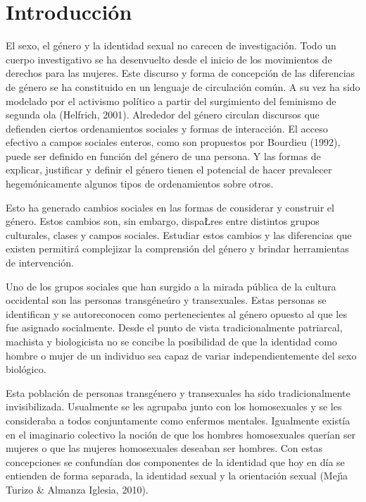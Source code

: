 \chapter{Introducción}\label{intro}

El sexo, el género y la identidad sexual no carecen de investigación.
Todo un cuerpo investigativo se ha desenvuelto desde el inicio de los
movimientos de derechos para las mujeres.
Este discurso y forma de concepción de las diferencias de género se ha
constituido en un lenguaje de circulación común.
A su vez ha sido modelado por el activismo político a partir del surgimiento
del feminismo de segunda ola (Helfrich, 2001).
Alrededor del género circulan discursos que defienden ciertos ordenamientos
sociales y formas de interacción.
El acceso efectivo a campos sociales enteros, como son propuestos por
Bourdieu (1992), puede ser definido en función del género de una persona.
Y las formas de explicar, justificar y definir el género tienen el potencial
de hacer prevalecer hegemónicamente algunos tipos de ordenamientos sobre otros.

Esto ha generado cambios sociales en las formas de considerar y construir el
género.
Estos cambios son, sin embargo, dispaŁres entre distintos grupos culturales,
clases y campos sociales.
Estudiar estos cambios y las diferencias que existen permitirá complejizar
la comprensión del género y brindar herramientas de intervención.

Uno de los grupos sociales que han surgido a la mirada pública de la cultura
occidental son las personas transgéneúro y transexuales.
Estas personas se identifican y se autoreconocen como pertenecientes al
género opuesto al que les fue asignado socialmente.
Desde el punto de vista tradicionalmente patriarcal, machista y biologicista
no se concibe la posibilidad de que la identidad como hombre o mujer de un
individuo sea capaz de variar independientemente del sexo biológico.

Esta población de personas transgénero y transexuales ha sido
tradicionalmente invisibilizada.
Usualmente se les agrupaba junto con los homosexuales y se les consideraba a
todos conjuntamente como enfermos mentales.
Igualmente existía en el imaginario colectivo la noción de que los hombres
homosexuales querían ser mujeres o que las mujeres homosexuales deseaban ser
hombres.
Con estas concepciones se confundían dos componentes de la identidad que hoy
en día se entienden de forma separada, la identidad sexual y la orientación
sexual (Mejı́a Turizo \& Almanza Iglesia, 2010).


